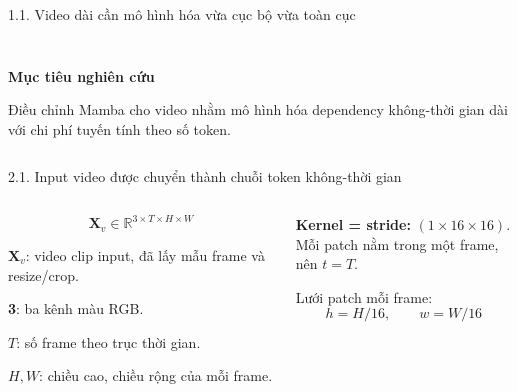 \documentclass[aspectratio=169,9pt]{beamer}
\newcommand{\source}[1]{}
\newcommand{\heading}[1]{{\bfseries\color{PTITRed} #1\par}}
\begin{document}
\begin{frame}{1.1. Video dài cần mô hình hóa vừa cục bộ vừa toàn cục}
\begin{columns}[T,onlytextwidth]
\begin{column}{0.48\textwidth}
\begin{tcolorbox}[titlepanel,title=Khoảng trống của các họ mô hình,equal height group=s1_top]
{\begin{tabularx}{\linewidth}{@{}L{1.72cm}Y Y@{}}
          \bottomrule
        \end{tabularx}}
      \end{tcolorbox}
      \vspace{0.14cm}
      \begin{tcolorbox}[keypanel,equal height group=s1_bot]
        \heading{Mục tiêu nghiên cứu}
        Điều chỉnh Mamba cho video nhằm mô hình hóa dependency không-thời gian dài với chi phí tuyến tính theo số token.
      \end{tcolorbox}
    \end{column}
  \end{columns}
  \vfill
  \source{Nguồn: VideoMamba, Introduction; độ phức tạp SSM theo Section 3.1.}
\end{frame}

\begin{frame}{2.1. Input video được chuyển thành chuỗi token không-thời gian}
  \vspace{0.10cm}
  \begin{columns}[T,onlytextwidth]
    \begin{column}{0.30\textwidth}
      \begin{tcolorbox}[titlepanel,title=1. Video tensor $\mathbf X_v$, equal height group=s2]
        \centering
        \[
          \mathbf X_v\in\mathbb R^{3\times T\times H\times W}
        \]
        \vspace{-0.12cm}
        \raggedright
        $\mathbf X_v$: video clip input, đã lấy mẫu frame và resize/crop.\par
        \vspace{0.08cm}
        {\fontsize{7.35}{8.55}\selectfont
        \textbf{3}: ba kênh màu RGB.\par
        \textbf{$T$}: số frame theo trục thời gian.\par
        \textbf{$H,W$}: chiều cao, chiều rộng của mỗi frame.}
      \end{tcolorbox}
    \end{column}
    \begin{column}{0.33\textwidth}
      \begin{tcolorbox}[titlepanel,title=2. Patchify và $L$, equal height group=s2]
        \raggedright
        \textbf{Kernel = stride:} $(1\times16\times16)$.\\
        Mỗi patch nằm trong một frame, nên $t=T$.\par
        \vspace{0.08cm}
        Lưới patch mỗi frame:
        \centering
        \[
          h=H/16,\qquad w=W/16
\]
\end{tcolorbox}
\end{column}
\end{columns}
\end{frame}
\end{document}
